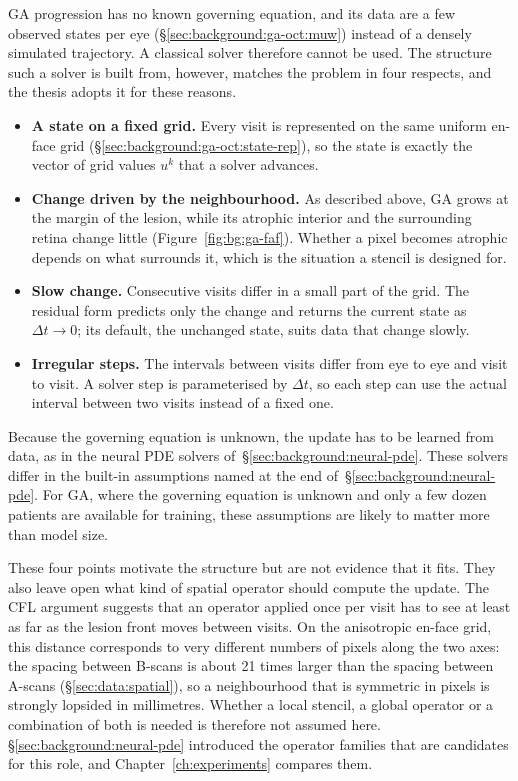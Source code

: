 GA progression has no known governing equation, and its data are a few
observed states per eye (\S\ref{sec:background:ga-oct:muw}) instead of a
densely simulated trajectory. A classical solver therefore cannot be used.
The structure such a solver is built from, however, matches the problem in
four respects, and the thesis adopts it for these reasons.
\begin{itemize}
  \item \textbf{A state on a fixed grid.} Every visit is represented on
    the same uniform en-face grid (\S\ref{sec:background:ga-oct:state-rep}),
    so the state is exactly the vector of grid values $u^{k}$ that a
    solver advances.
  \item \textbf{Change driven by the neighbourhood.} As described above,
    GA grows at the margin of the lesion, while its atrophic interior and
    the surrounding retina change little (Figure~\ref{fig:bg:ga-faf}). Whether a pixel becomes atrophic
    depends on what surrounds it, which is the situation a stencil is
    designed for.
  \item \textbf{Slow change.} Consecutive visits differ in a small part
    of the grid. The residual form predicts only the change and returns
    the current state as $\Delta t \to 0$; its default, the unchanged
    state, suits data that change slowly.
  \item \textbf{Irregular steps.} The intervals between visits differ
    from eye to eye and visit to visit. A solver step is parameterised by $\Delta t$, so each step can use the
    actual interval between two visits instead of a fixed one.
\end{itemize}


Because the governing equation is unknown, the update has to be learned
from data, as in the neural PDE solvers
of~\S\ref{sec:background:neural-pde}. These solvers differ in the
built-in assumptions named at the end of~\S\ref{sec:background:neural-pde}.
For
GA, where the governing equation is unknown and only a few dozen patients
are available for training, these assumptions are likely to matter more
than model size.


These four points motivate the structure but are not evidence that it
fits. They also leave open what kind of spatial operator should compute
the update. The CFL argument suggests that an operator applied once per
visit has to see at least as far as the lesion front moves between
visits. On the anisotropic en-face grid, this distance corresponds to very
different numbers of pixels along the two axes: the spacing between
B-scans is about 21 times larger than the spacing between A-scans
(\S\ref{sec:data:spatial}), so a neighbourhood that is symmetric in pixels
is strongly lopsided in millimetres. Whether a local
stencil, a global operator or a combination of both is needed is
therefore not assumed here. \S\ref{sec:background:neural-pde} introduced
the operator families that are candidates for this role, and
Chapter~\ref{ch:experiments} compares them.


